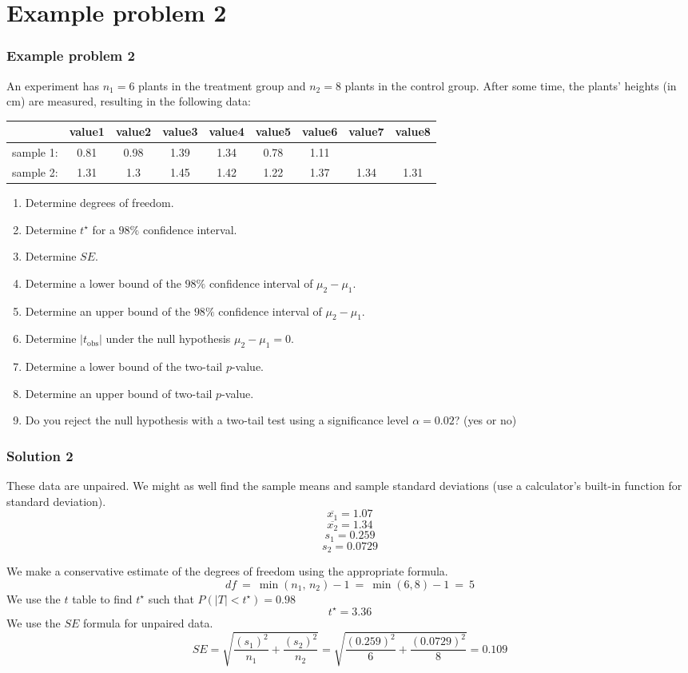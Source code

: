 \documentclass[11pt,containsverbatim,handout]{beamer}
\begin{document}
\section{Example problem 2}
\begin{frame}
\frametitle{Example problem 2} \vspace{-10pt}
An experiment has \(n_1 = 6\) plants in the treatment group and
\(n_2 = 8\) plants in the control group. After some time, the plants'
heights (in cm) are measured, resulting in the following data:
{\footnotesize \hspace{-20pt}\begin{tabular}{|ccccccccc|} \hline 
& value1 & value2 & value3 & value4 & value5 & value6 & value7 & value8 \\ \hline
sample 1: & 0.81 & 0.98 & 1.39 & 1.34 & 0.78 & 1.11 & & \\
sample 2: & 1.31 & 1.3 & 1.45 & 1.42 & 1.22 & 1.37 & 1.34 &
1.31\\ \hline
\end{tabular} }
\begin{enumerate}
  \item Determine degrees of freedom.
  \item Determine \(t^\star\) for a \(98\%\) confidence interval.
  \item Determine \(SE\).
  \item Determine a lower bound of the \(98\%\) confidence interval of
\(\mu_2-\mu_1\).
  \item Determine an upper bound of the \(98\%\) confidence interval of
\(\mu_2-\mu_1\).
  \item Determine \(|t_\text{obs}|\) under the null hypothesis
\(\mu_2-\mu_1=0\).
  \item Determine a lower bound of the two-tail \(p\)-value.
  \item Determine an upper bound of two-tail \(p\)-value.
  \item Do you reject the null hypothesis with a two-tail test using a
significance level \(\alpha = 0.02\)? (yes or no)
\end{enumerate}
\end{frame}



\begin{frame} \small
\frametitle{Solution 2}
These data are unpaired. We might as well find the sample means and
sample standard deviations (use a calculator's built-in function for
standard deviation). \[\overline{x_1} = 1.07 \]
\[\overline{x_2} = 1.34 \] \[s_1 = 0.259 \] \[s_2 = 0.0729 \]

We make a conservative estimate of the degrees of freedom using the
appropriate formula. \[df ~=~ \min(n_1,\,n_2)-1 ~=~ \min(6,8)-1 ~=~ 5 \]
We use the \(t\) table to find \(t^\star\) such that
\(P(|T|<t^\star) = 0.98\) \[t^\star = 3.36 \] We use the \(SE\) formula
for unpaired data.
\[SE = \sqrt{\frac{(s_1)^2}{n_1}+\frac{(s_2)^2}{n_2}} =
\sqrt{\frac{(0.259)^2}{6}+\frac{(0.0729)^2}{8}} = 0.109 \] 
\end{frame}
\end{document}
